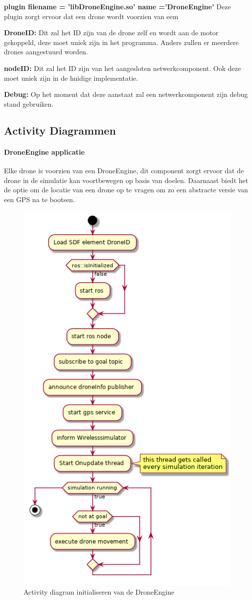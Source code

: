 \documentclass[a4paper, 11pt, oneside]{report}
\begin{document}
\textbf{plugin filename = 'libDroneEngine.so' name ='DroneEngine'} Deze plugin zorgt ervoor dat een drone wordt voorzien van eem 


\textbf{DroneID:} Dit zal het ID zijn van de drone zelf en wordt aan de motor gekoppeld, deze moet uniek zijn in het programma. Anders zullen er meerdere drones aangestuurd worden.

\textbf{nodeID:} Dit zal het ID zijn van het aangesloten netwerkcomponent. Ook deze moet uniek zijn in de huidige implementatie. 

\textbf{Debug:} Op het moment dat deze aanstaat zal een netwerkcomponent zijn debug stand gebruiken.



\subsection{Activity Diagrammen}
\label{DetailedDesign:MeshNetwerk:activity}


\paragraph{DroneEngine applicatie}
\label{DetailedDesign:MeshNetwerk:Activity:initaliserenDrone}
Elke drone is voorzien van een DroneEngine, dit component zorgt ervoor dat de drone in de simulatie kan voortbewegen op basis van doelen.
Daarnaast biedt het de optie om de locatie van een drone op te vragen om zo een abstracte versie van een GPS na te bootsen.
\begin{figure}[H]
	\begin{center}\includegraphics[width=.45\linewidth]{UML/out/DroneSimulation/Activity/DroneEngine/DroneEngine.png}\end{center}
	\caption{Activity diagram initialiseren van de DroneEngine}
	\label{fig:communication:MeshNetwerk:Activity:initialiserenDrone}
\end{figure}
\end{document}

